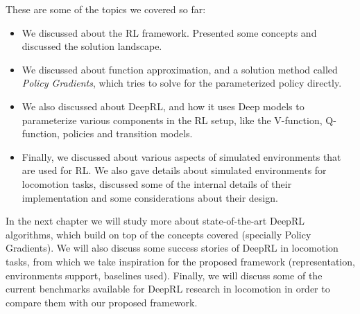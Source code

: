 These are some of the topics we covered so far:

\begin{itemize}
    \item We discussed about the RL framework. Presented some concepts and discussed
          the solution landscape. 

    \item We discussed about function approximation, and a solution method called 
          \textit{Policy Gradients}, which tries to solve for the parameterized policy 
          directly.

    \item We also discussed about DeepRL, and how it uses Deep models to parameterize
          various components in the RL setup, like the V-function, Q-function, policies
          and transition models.

    \item Finally, we discussed about various aspects of simulated environments that
          are used for RL. We also gave details about simulated environments for
          locomotion tasks, discussed some of the internal details of their implementation
          and some considerations about their design.
\end{itemize}

In the next chapter we will study more about state-of-the-art DeepRL algorithms, which
build on top of the concepts covered (specially Policy Gradients). We will also
discuss some success stories of DeepRL in locomotion tasks, from which we take inspiration
for the proposed framework (representation, environments support, baselines used). 
Finally, we will discuss some of the current benchmarks available for DeepRL research
in locomotion in order to compare them with our proposed framework.
